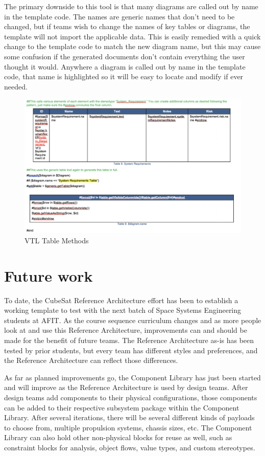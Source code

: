 \documentclass[conference]{joss-pretty}
\begin{document}
The primary downside to this tool is that many diagrams are called out by name in the template code. The names are generic names that don't need to be changed, but if teams wish to change the names of key tables or diagrams, the template will not import the applicable data. This is easily remedied with a quick change to the template code to match the new diagram name, but this may cause some confusion if the generated documents don't contain everything the user thought it would. Anywhere a diagram is called out by name in the template code, that name is highlighted so it will be easy to locate and modify if ever needed. 

\begin{figure}
    \centering
    \includegraphics[width=\textwidth]{Figures/two kinds of tables.png}
    \caption{VTL Table Methods}
    \label{fig:VTL Table Methods}
\end{figure}

\section{Future work}
To date, the CubeSat Reference Architecture effort has been to establish a working template to test with the next batch of Space Systems Engineering students at AFIT. As the course sequence curriculum changes and as more people look at and use this Reference Architecture, improvements can and should be made for the benefit of future teams. The Reference Architecture as-is has been tested by prior students, but every team has different styles and preferences, and the Reference Architecture can reflect those differences.

As far as planned improvements go, the Component Library has just been started and will improve as the Reference Architecture is used by design teams. After design teams add components to their physical configurations, those components can be added to their respective subsystem package within the Component Library. After several iterations, there will be several different kinds of payloads to choose from, multiple propulsion systems, chassis sizes, etc. The Component Library can also hold other non-physical blocks for reuse as well, such as constraint blocks for analysis, object flows, value types, and custom stereotypes.
\end{document}
